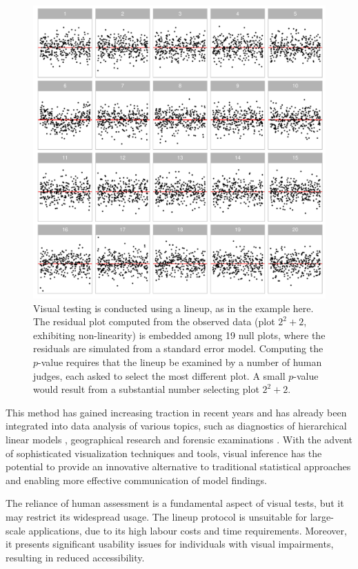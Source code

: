 \documentclass[11pt,a4paper,]{article}
\begin{document}
\begin{figure}
\centering
\includegraphics{report_files/figure-latex/lineup-example-1.pdf}
\caption{\label{fig:lineup-example}Visual testing is conducted using a lineup, as in the example here. The residual plot computed from the observed data (plot \(2^2 + 2\), exhibiting non-linearity) is embedded among 19 null plots, where the residuals are simulated from a standard error model. Computing the \(p\)-value requires that the lineup be examined by a number of human judges, each asked to select the most different plot. A small \(p\)-value would result from a substantial number selecting plot \(2^2 + 2\).}
\end{figure}

This method has gained increasing traction in recent years and has already been integrated into data analysis of various topics, such as diagnostics of hierarchical linear models \autocite{loy2013diagnostic}, geographical research \autocite{widen_graphical_2016} and forensic examinations \autocite{krishnan_hierarchical_2021}. With the advent of sophisticated visualization techniques and tools, visual inference has the potential to provide an innovative alternative to traditional statistical approaches and enabling more effective communication of model findings.

The reliance of human assessment is a fundamental aspect of visual tests, but it may restrict its widespread usage. The lineup protocol is unsuitable for large-scale applications, due to its high labour costs and time requirements. Moreover, it presents significant usability issues for individuals with visual impairments, resulting in reduced accessibility.
\end{document}
